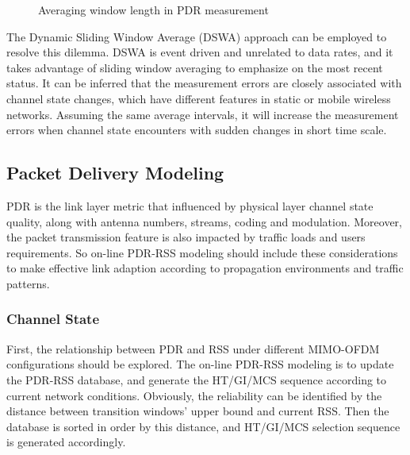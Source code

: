\documentclass[draftclsnofoot,journal,onecolumn,11pt]{IEEEtran}
\begin{document}
\begin{figure}[!htp]
\centerline{
}
\caption{Averaging window length in PDR measurement}
\label{method}
\end{figure}

The Dynamic Sliding Window Average (DSWA) approach can be employed to resolve this dilemma. DSWA is event driven and unrelated to data rates, and it takes advantage of sliding window averaging to emphasize on the most recent status. It can be inferred that the measurement errors are closely associated with channel state changes, which have different features in static or mobile wireless networks. Assuming the same average intervals, it will increase the measurement errors when channel state encounters with sudden changes in short time scale.

\subsection{Packet Delivery Modeling} \label{sect:modeling}

PDR is the link layer metric that influenced by physical layer channel state quality, along with antenna numbers, streams, coding and modulation. Moreover, the packet transmission feature is also impacted by traffic loads and users requirements. So on-line PDR-RSS modeling should include these considerations to make effective link adaption according to propagation environments and traffic patterns.

\subsubsection{Channel State}
First, the relationship between PDR and RSS under different MIMO-OFDM configurations should be explored. The on-line PDR-RSS modeling is to update the PDR-RSS database, and generate the HT/GI/MCS sequence according to current network conditions. Obviously, the reliability can be identified by the distance between transition windows' upper bound and current RSS. Then the database is sorted in order by this distance, and HT/GI/MCS selection sequence is generated accordingly.
\end{document}
